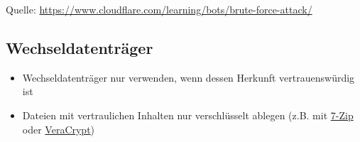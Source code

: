 \begin{frame}
\begin{center}


\scriptsize Quelle: \href{https://www.cloudflare.com/learning/bots/brute-force-attack/}{https://www.cloudflare.com/learning/bots/brute-force-attack/}
\end{center}
\end{frame}



\subsection{Wechseldatenträger}

\begin{frame}
\begin{itemize}
	\item Wechseldatenträger nur verwenden, wenn dessen Herkunft vertrauenswürdig ist
	\item Dateien mit vertraulichen Inhalten nur verschlüsselt ablegen (z.B. mit \href{http://www.7-zip.de/}{7-Zip} oder \href{https://www.veracrypt.fr}{VeraCrypt})
\end{itemize}
\end{frame}

